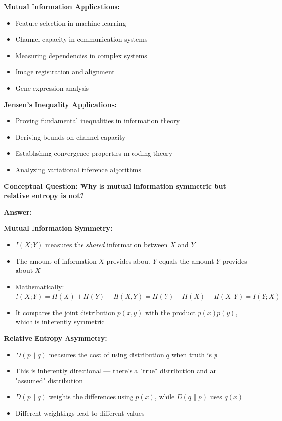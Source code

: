 \documentclass[11pt,a4paper]{book}
\newenvironment{formulabox}[1][Formula]{
    \begin{tcolorbox}[
        enhanced,
        breakable,
        colback=softcoral!10,
        colframe=softcoral!200,
        title=#1,
        fonttitle=\bfseries,
        coltitle=white,
        sharp corners,
        boxrule=1pt,
        left=8pt,
        right=8pt,
        top=6pt,
        bottom=6pt
    ]
}{
    \end{tcolorbox}
}
\newenvironment{infobox}[1][For more understanding]{
    \begin{tcolorbox}[
        enhanced,
        breakable,
        colback=mintgreen!10,
        colframe=mintgreen!200,
        title=#1,
        fonttitle=\bfseries,
        sharp corners,
        boxrule=0.8pt,
        left=8pt,
        right=8pt,
        top=6pt,
        bottom=6pt
    ]
}{
    \end{tcolorbox}
}
\newcounter{qna}[chapter]
\renewcommand{\theqna}{\thechapter.\arabic{qna}}
\newenvironment{questionanswerbox}{
    \refstepcounter{qna}%
    \begin{tcolorbox}[
        enhanced,
        breakable,
        colback=softlavender!10,
        colframe=softlavender!200,
        title={Example~\theqna}, %
        fonttitle=\bfseries,
        coltitle=white,
        colbacktitle=softlavender!200,
        sharp corners,
        boxrule=1pt,
        left=8pt,
        right=8pt,
        top=6pt,
        bottom=6pt
    ]
}{
    \end{tcolorbox}
}
\begin{document}
\begin{formulabox}[General Conditional Chain Rule]
\begin{infobox}[Why These Concepts Matter]
    \textbf{Mutual Information Applications:}
    \begin{itemize}
        \item Feature selection in machine learning
        \item Channel capacity in communication systems
        \item Measuring dependencies in complex systems
        \item Image registration and alignment
        \item Gene expression analysis
    \end{itemize}
    
    \textbf{Jensen's Inequality Applications:}
    \begin{itemize}
        \item Proving fundamental inequalities in information theory
        \item Deriving bounds on channel capacity
        \item Establishing convergence properties in coding theory
        \item Analyzing variational inference algorithms
    \end{itemize}
\end{infobox}

\begin{questionanswerbox}
    \textbf{Conceptual Question: Why is mutual information symmetric but relative entropy is not?}
    
    \textbf{Answer:}
    
    \textbf{Mutual Information Symmetry:}
    \begin{itemize}
        \item \(I(X;Y)\) measures the \emph{shared} information between \(X\) and \(Y\)
        \item The amount of information \(X\) provides about \(Y\) equals the amount \(Y\) provides about \(X\)
        \item Mathematically: \(I(X;Y) = H(X) + H(Y) - H(X,Y) = H(Y) + H(X) - H(X,Y) = I(Y;X)\)
        \item It compares the joint distribution \(p(x,y)\) with the product \(p(x)p(y)\), which is inherently symmetric
    \end{itemize}
    
    \textbf{Relative Entropy Asymmetry:}
    \begin{itemize}
        \item \(D(p \| q)\) measures the cost of using distribution \(q\) when truth is \(p\)
        \item This is inherently directional — there's a "true" distribution and an "assumed" distribution
        \item \(D(p \| q)\) weights the differences using \(p(x)\), while \(D(q \| p)\) uses \(q(x)\)
        \item Different weightings lead to different values
    \end{itemize}
    

\end{questionanswerbox}
\end{formulabox}
\end{document}
